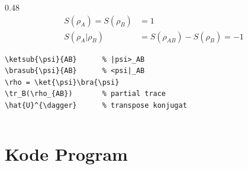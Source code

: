\begin{frame}[fragile]
\begin{columns}[T]
\begin{column}{0.48\textwidth}
{\begin{align*}
        S(\rho_A) = S(\rho_B) &= 1 \\
        S(\rho_A|\rho_B) &= S(\rho_{AB}) - S(\rho_B) = -1
      \end{align*}}
      \begin{lstlisting}[basicstyle=\ttfamily\tiny]
\ketsub{\psi}{AB}      % |psi>_AB
\brasub{\psi}{AB}      % <psi|_AB
\rho = \ket{\psi}\bra{\psi}
\tr_B(\rho_{AB})       % partial trace
\hat{U}^{\dagger}      % transpose konjugat
      \end{lstlisting}
    \end{column}
  \end{columns}
\end{frame}

\section{Kode Program}

